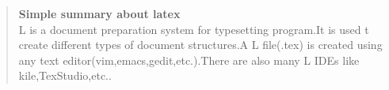 \documentclass[a4paper]{article}
\begin{document}
\begin{abstract}
\textbf{Simple summary about latex}\\
L is a document preparation system for typesetting program.It is used t create different
types of document structures.A L file(.tex) is created using any text
editor(vim,emacs,gedit,etc.).There are also many L IDEs like kile,TexStudio,etc..
\end{abstract}
\end{document}
